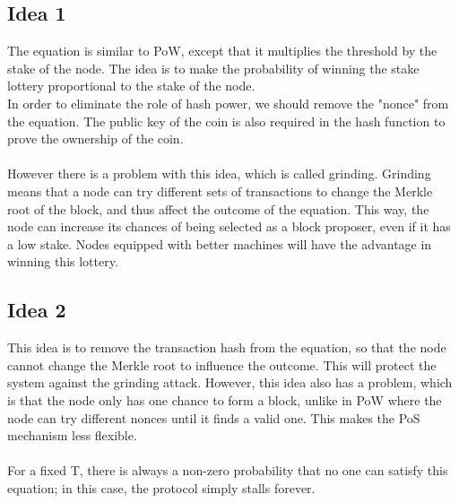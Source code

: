 \subsection{Idea 1}
The equation is similar to PoW, except that it multiplies the threshold by the stake of the node. The idea is to make the probability of winning the stake lottery proportional to the stake of the node.\\
In order to eliminate the role of hash power, we should remove the "nonce" from the equation. The public key of the coin is also required in the hash function to prove the ownership of the coin.\\\\
However there is a problem with this idea, which is called grinding. Grinding means that a node can try different sets of transactions to change the Merkle root of the block, and thus affect the outcome of the equation. This way, the node can increase its chances of being selected as a block proposer, even if it has a low stake. Nodes equipped with better machines will have the advantage in winning this lottery.

\subsection*{Idea 2}
This idea is to remove the transaction hash from the equation, so that the node cannot change the Merkle root to influence the outcome. This will protect the system against the grinding attack.
However, this idea also has a problem, which is that the node only has one chance to form a block, unlike in PoW where the node can try different nonces until it finds a valid one. This makes the PoS mechanism less flexible.\\\\
For a fixed T, there is always a non-zero probability that no one can satisfy this equation; in this case, the protocol simply stalls forever.
